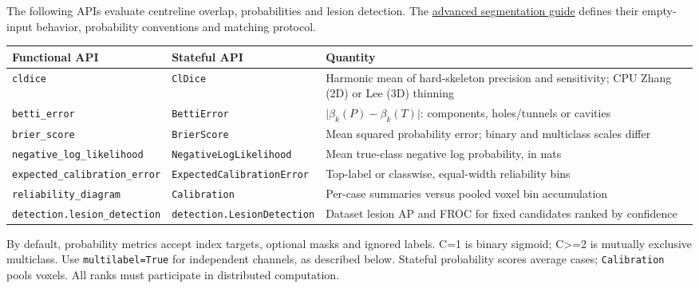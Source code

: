 The following APIs evaluate centreline overlap, probabilities and lesion detection. The
\href{https://github.com/rodolfo-viana/exacta/wiki/Advanced-segmentation}{advanced segmentation guide}
defines their empty-input behavior, probability conventions and matching protocol.

{\small{} %
\begin{longtable}[]{@{}
  >{\raggedright\arraybackslash}p{}
  >{\raggedright\arraybackslash}p{}
  >{\raggedright\arraybackslash}p{}@{}}
\toprule\noalign{}
\begin{minipage}[b]{\linewidth}\raggedright
Functional API
\end{minipage} & \begin{minipage}[b]{\linewidth}\raggedright
Stateful API
\end{minipage} & \begin{minipage}[b]{\linewidth}\raggedright
Quantity
\end{minipage} \\
\midrule\noalign{}
\endhead
\bottomrule\noalign{}
\endlastfoot
\texttt{cldice} & \texttt{ClDice} & Harmonic mean of hard-skeleton precision and sensitivity; CPU Zhang (2D) or Lee (3D) thinning \\
\texttt{betti\_error} & \texttt{BettiError} & \(\lvert\beta_k(P)-\beta_k(T)\rvert\): components, holes/tunnels or cavities \\
\texttt{brier\_score} & \texttt{BrierScore} & Mean squared probability error; binary and multiclass scales differ \\
\texttt{negative\_log\_likelihood} & \texttt{NegativeLogLikelihood} & Mean true-class negative log probability, in nats \\
\texttt{expected\_calibration\_error} & \texttt{ExpectedCalibrationError} & Top-label or classwise, equal-width reliability bins \\
\texttt{reliability\_diagram} & \texttt{Calibration} & Per-case summaries versus pooled voxel bin accumulation \\
\texttt{detection.lesion\_detection} & \texttt{detection.LesionDetection} & Dataset lesion AP and FROC for fixed candidates ranked by confidence \\
\end{longtable}
}

By default, probability metrics accept index targets, optional masks and ignored labels. C=1
is binary sigmoid; C\textgreater=2 is mutually exclusive multiclass. Use \texttt{multilabel=True} for independent
channels, as described below. Stateful probability scores average cases; \texttt{Calibration} pools
voxels. All ranks must participate in distributed computation.


